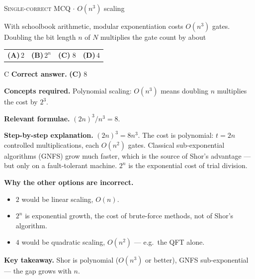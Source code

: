 \documentclass[11pt,a4paper]{article}
\newcommand{\optlabel}[1]{\textbf{(#1)}}
\newcommand{\correctlabel}[1]{\textcolor{okgreen}{\textbf{(#1)}\,\ding{51}}}
\newenvironment{qitem}[1]{\begin{list}{}{\setlength{\leftmargin}{3.3em}\setlength{\labelwidth}{3.1em}%
  \setlength{\labelsep}{0.2em}\setlength{\topsep}{3pt}\setlength{\parsep}{3pt}}\item[\textbf{Q.#1}\hfill]}{\end{list}}
\newcommand{\qsep}{\par\vspace{2pt}{\color{black!15}\hrule}\vspace{4pt}}
\newcommand{\qmeta}[2]{{\footnotesize\color{black!60}\textsc{#1} \;$\cdot$\; #2}\par}
\begin{document}
\begin{qitem}{63}
\qmeta{Single-correct MCQ}{$O(n^3)$ scaling}
With schoolbook arithmetic, modular exponentiation costs $O(n^3)$ gates. Doubling the bit length $n$ of $N$ multiplies the gate count by about
\par\smallskip\noindent\begin{tabularx}{\linewidth}{@{}*{4}{L}@{}}
\optlabel{A}\,$2$ & \optlabel{B}\,$2^{n}$ & \correctlabel{C}\,$8$ & \optlabel{D}\,$4$
\end{tabularx}
\end{qitem}
\begin{solbox}{C}
\textbf{\color{brand}Correct answer.} \textcolor{okgreen}{\textbf{(C)}} $8$

\textbf{\color{brand}Concepts required.} Polynomial scaling: $O(n^3)$ means doubling $n$ multiplies the cost by $2^3$.

\textbf{\color{brand}Relevant formulae.} $(2n)^3/n^3 = 8$.

\textbf{\color{brand}Step-by-step explanation.} $(2n)^3 = 8n^3$. The cost is polynomial: $t = 2n$ controlled multiplications, each $O(n^2)$ gates. Classical sub-exponential algorithms (GNFS) grow much faster,
which is the source of Shor's advantage --- but only on a fault-tolerant machine. $2^n$ is the exponential cost of trial division.

\textbf{\color{brand}Why the other options are incorrect.}
\begin{itemize}[leftmargin=2.4em, itemsep=1pt, topsep=2pt]
\item[\textbf{(A)}] $2$ would be linear scaling, $O(n)$.
\item[\textbf{(B)}] $2^n$ is exponential growth, the cost of brute-force methods, not of Shor's algorithm.
\item[\textbf{(D)}] $4$ would be quadratic scaling, $O(n^2)$ --- e.g.\ the QFT alone.
\end{itemize}
\textbf{\color{brand}Key takeaway.} Shor is polynomial ($O(n^3)$ or better), GNFS sub-exponential --- the gap grows with $n$.
\end{solbox}
\qsep
\end{document}
